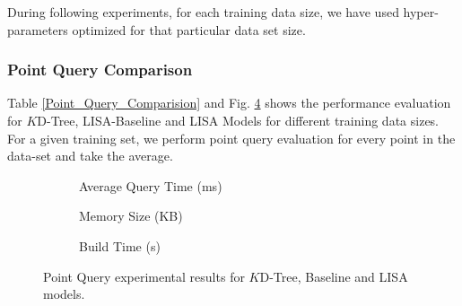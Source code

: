 During following experiments, for each training data size, we have used hyper-parameters optimized for that particular data set size. 

\subsubsection{Point Query Comparison}
Table \ref{Point_Query_Comparision} and  Fig. \ref{fig:Point_Query_Comparision} shows the performance evaluation for $K$D-Tree, LISA-Baseline and LISA Models for different training data sizes. For a given training set, we perform point query evaluation for every point in the data-set and take the average. 

\begin{figure}
 	 \centering
     \begin{subfigure}[b]{0.32\textwidth}
         \centering
         
         \caption{Average Query Time (ms)}
         \label{fig:2d_exp2_1_1}
     \end{subfigure}
     \hfill
     \begin{subfigure}[b]{0.32\textwidth}
         \centering
         
         \caption{Memory Size (KB)}
         \label{fig:2d_exp2_1_2}
     \end{subfigure}
     \hfill
     \begin{subfigure}[b]{0.32\textwidth}
         \centering
         
         \caption{Build Time (s)}
         \label{fig:2d_exp2_1_3}
     \end{subfigure}
     \hfill
     \caption{Point Query experimental results for $K$D-Tree, Baseline and LISA models.}
     \label{fig:Point_Query_Comparision}
\end{figure}

